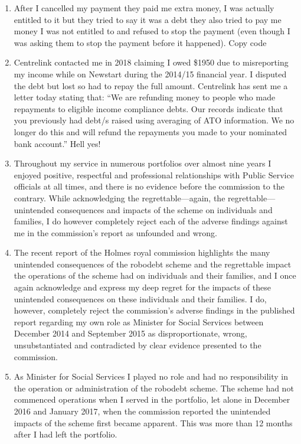 \documentclass{article}
\begin{document}
\begin{enumerate}
\item After I cancelled my payment they paid me extra money, I was actually entitled to it but they tried to say it was a debt they also tried to pay me money I was not entitled to and refused to stop the payment (even though I was asking them to stop the payment before it happened).
Copy code\item Centrelink contacted me in 2018 claiming I owed \$1950 due to misreporting my income while on Newstart during the 2014/15 financial year. I disputed the debt but lost so had to repay the full amount. Centrelink has sent me a letter today stating that: ``We are refunding money to people who made repayments to eligible income compliance debts. Our records indicate that you previously had debt/s raised using averaging of ATO information. We no longer do this and will refund the repayments you made to your nominated bank account.'' Hell yes!

\item Throughout my service in numerous portfolios over almost nine years I enjoyed positive, respectful and professional relationships with Public Service officials at all times, and there is no evidence before the commission to the contrary. While acknowledging the regrettable—again, the regrettable—unintended consequences and impacts of the scheme on individuals and families, I do however completely reject each of the adverse findings against me in the commission's report as unfounded and wrong.

\item The recent report of the Holmes royal commission highlights the many unintended consequences of the robodebt scheme and the regrettable impact the operations of the scheme had on individuals and their families, and I once again acknowledge and express my deep regret for the impacts of these unintended consequences on these individuals and their families. I do, however, completely reject the commission's adverse findings in the published report regarding my own role as Minister for Social Services between December 2014 and September 2015 as disproportionate, wrong, unsubstantiated and contradicted by clear evidence presented to the commission.

\item As Minister for Social Services I played no role and had no responsibility in the operation or administration of the robodebt scheme. The scheme had not commenced operations when I served in the portfolio, let alone in December 2016 and January 2017, when the commission reported the unintended impacts of the scheme first became apparent. This was more than 12 months after I had left the portfolio.


\end{enumerate}
\end{document}
